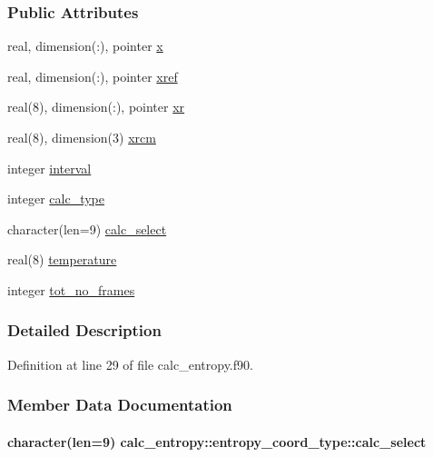 \subsubsection*{Public Attributes}
\begin{DoxyCompactItemize}
\item 
real, dimension(\-:), pointer \hyperlink{structcalc__entropy_1_1entropy__coord__type_a283c623301accb22a8f951c05369478d}{x}
\item 
real, dimension(\-:), pointer \hyperlink{structcalc__entropy_1_1entropy__coord__type_af8dd0a14d5d570b4884947c9fb9e7855}{xref}
\item 
real(8), dimension(\-:), pointer \hyperlink{structcalc__entropy_1_1entropy__coord__type_ac85be6a3407782edbf5483783e7610fd}{xr}
\item 
real(8), dimension(3) \hyperlink{structcalc__entropy_1_1entropy__coord__type_acdc087704040a17ff0eec2e96dc00ad0}{xrcm}
\item 
integer \hyperlink{structcalc__entropy_1_1entropy__coord__type_abb056ea5be35d22a42a119a69c98ee35}{interval}
\item 
integer \hyperlink{structcalc__entropy_1_1entropy__coord__type_a97edc94365c6b3b86c5eebda44ea8f4b}{calc\-\_\-type}
\item 
character(len=9) \hyperlink{structcalc__entropy_1_1entropy__coord__type_ab637c75f74850fc649cd018c2f19c819}{calc\-\_\-select}
\item 
real(8) \hyperlink{structcalc__entropy_1_1entropy__coord__type_ad340c0c4f4f7d6ce65f684f9a9c35668}{temperature}
\item 
integer \hyperlink{structcalc__entropy_1_1entropy__coord__type_a7f44c31e1db1462eff29570c5947c077}{tot\-\_\-no\-\_\-frames}
\end{DoxyCompactItemize}


\subsubsection{Detailed Description}


Definition at line 29 of file calc\-\_\-entropy.\-f90.



\subsubsection{Member Data Documentation}
\hypertarget{structcalc__entropy_1_1entropy__coord__type_ab637c75f74850fc649cd018c2f19c819}{
\paragraph[{calc\-\_\-select}]{\setlength{\rightskip}{0pt plus 5cm}character(len=9) calc\-\_\-entropy\-::entropy\-\_\-coord\-\_\-type\-::calc\-\_\-select}}\label{structcalc__entropy_1_1entropy__coord__type_ab637c75f74850fc649cd018c2f19c819}


